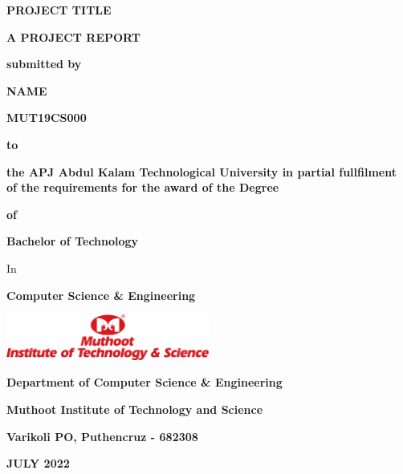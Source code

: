 \documentclass[a4paper,12pt,oneside]{report}  %
\begin{document}
\begin{titlepage}
\addtolength{\hoffset}{0cm}
\centering
{\scshape\large \bfseries PROJECT TITLE \par}
\vspace{1cm}
{\scshape \bfseries A PROJECT REPORT \par}


\vspace{0.5cm}
{\small \bfseries submitted by \par}
\vspace{0.5cm}
{\large \bfseries NAME \par}
{\large \bfseries MUT19CS000 \par}
\vspace{0.5cm}
{\small \bfseries to \par}
\vspace{0.5cm}
{\small \bfseries  the APJ Abdul Kalam Technological University in partial fullfilment of the requirements for the award of the Degree \par}
\vspace{0.5cm}
{\small \bfseries of \par}
\vspace{0.5cm}
{\bfseries Bachelor of Technology\par}
{ In \par}
{\bfseries Computer Science \& Engineering \par}
\vspace{1cm}
\includegraphics[width=0.50\textwidth]{MITS.png}\par\vspace{1cm}
{\bfseries Department of Computer Science \& Engineering\par}
{\bfseries Muthoot Institute of Technology and Science\par}
{\bfseries Varikoli PO, Puthencruz - 682308 \par}
\vspace{1cm}
{\bfseries JULY 2022 \par}
\end{titlepage}
\end{document}
